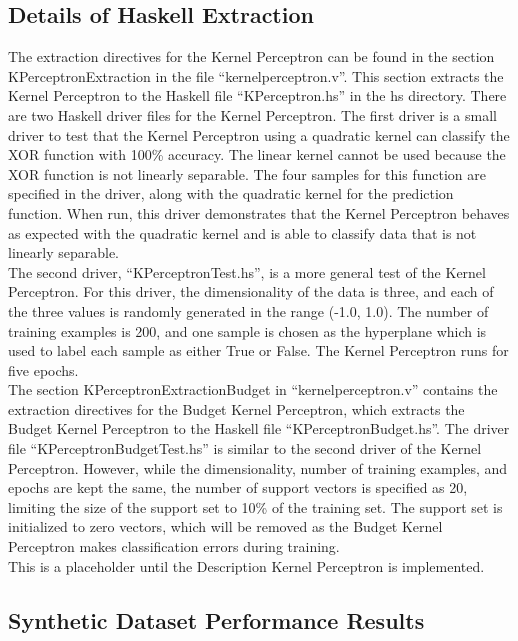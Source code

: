 \subsection{Details of Haskell Extraction}\label{DetailsHaskellExtraction}
The extraction directives for the Kernel Perceptron can be found in the section KPerceptronExtraction in the file ``kernelperceptron.v''. This section extracts the Kernel Perceptron to the Haskell file ``KPerceptron.hs'' in the hs directory. There are two Haskell driver files for the Kernel Perceptron. The first driver is a small driver to test that the Kernel Perceptron using a quadratic kernel can classify the XOR function with 100\% accuracy. The linear kernel cannot be used because the XOR function is not linearly separable. The four samples for this function are specified in the driver, along with the quadratic kernel for the prediction function. When run, this driver demonstrates that the Kernel Perceptron behaves as expected with the quadratic kernel and is able to classify data that is not linearly separable.
\\The second driver, ``KPerceptronTest.hs'', is a more general test of the Kernel Perceptron. For this driver, the dimensionality of the data is three, and each of the three values is randomly generated in the range (-1.0, 1.0). The number of training examples is 200, and one sample is chosen as the hyperplane which is used to label each sample as either True or False. The Kernel Perceptron runs for five epochs.
\\The section KPerceptronExtractionBudget in ``kernelperceptron.v'' contains the extraction directives for the Budget Kernel Perceptron, which extracts the Budget Kernel Perceptron to the Haskell file ``KPerceptronBudget.hs''. The driver file ``KPerceptronBudgetTest.hs'' is similar to the second driver of the Kernel Perceptron. However, while the dimensionality, number of training examples, and epochs are kept the same, the number of support vectors is specified as 20, limiting the size of the support set to 10\% of the training set. The support set is initialized to zero vectors, which will be removed as the Budget Kernel Perceptron makes classification errors during training. 
\\This is a placeholder until the Description Kernel Perceptron is implemented.
\subsection{Synthetic Dataset Performance Results}\label{SyntheticResults}
